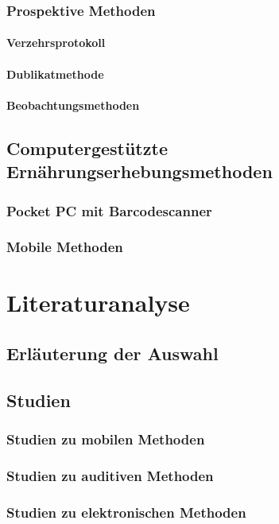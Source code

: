 \subsubsection{Prospektive Methoden}

\paragraph{Verzehrsprotokoll}

\paragraph{Dublikatmethode}

\paragraph{Beobachtungsmethoden}

\subsection{Computergestützte Ernährungserhebungsmethoden}

\subsubsection{Pocket PC mit Barcodescanner}

\subsubsection{Mobile Methoden}

\section{Literaturanalyse}

\subsection{Erläuterung der Auswahl}

\subsection{Studien}
\subsubsection{Studien zu mobilen Methoden}
\subsubsection{Studien zu auditiven Methoden}
\subsubsection{Studien zu elektronischen Methoden}





